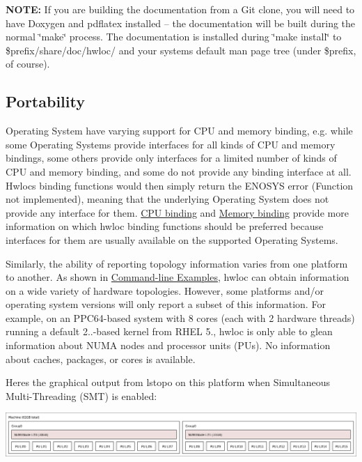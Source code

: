 {\bfseries N\+O\+TE\+:} If you are building the documentation from a Git clone, you will need to have Doxygen and pdflatex installed -- the documentation will be built during the normal \char`\"{}make\char`\"{} process. The documentation is installed during \char`\"{}make install\char`\"{} to \$prefix/share/doc/hwloc/ and your systems default man page tree (under \$prefix, of course).\hypertarget{a00379_portability}{}\subsection{Portability}\label{a00379_portability}
Operating System have varying support for C\+PU and memory binding, e.\+g. while some Operating Systems provide interfaces for all kinds of C\+PU and memory bindings, some others provide only interfaces for a limited number of kinds of C\+PU and memory binding, and some do not provide any binding interface at all. Hwloc\textquotesingle{}s binding functions would then simply return the E\+N\+O\+S\+YS error (Function not implemented), meaning that the underlying Operating System does not provide any interface for them. \hyperlink{a00190}{C\+PU binding} and \hyperlink{a00191}{Memory binding} provide more information on which hwloc binding functions should be preferred because interfaces for them are usually available on the supported Operating Systems.

Similarly, the ability of reporting topology information varies from one platform to another. As shown in \hyperlink{a00379_cli_examples}{Command-\/line Examples}, hwloc can obtain information on a wide variety of hardware topologies. However, some platforms and/or operating system versions will only report a subset of this information. For example, on an P\+P\+C64-\/based system with 8 cores (each with 2 hardware threads) running a default 2..-\/based kernel from R\+H\+EL 5., hwloc is only able to glean information about N\+U\+MA nodes and processor units (P\+Us). No information about caches, packages, or cores is available.

Here\textquotesingle{}s the graphical output from lstopo on this platform when Simultaneous Multi-\/\+Threading (S\+MT) is enabled\+:

 
\begin{DoxyImageNoCaption}
  \mbox{\includegraphics[width=\textwidth]{ppc64-with-smt.png}}
\end{DoxyImageNoCaption}



